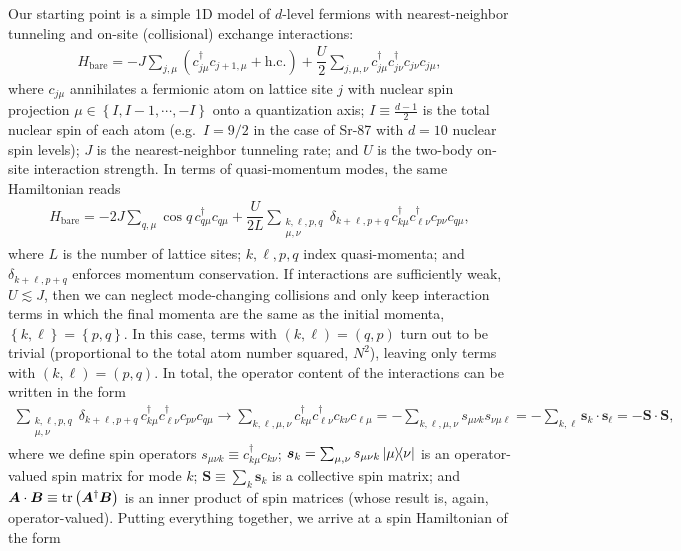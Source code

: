\documentclass[nofootinbib,notitlepage,11pt]{revtex4-2}
\renewcommand{\t}{\text} %
\newcommand{\f}[2]{\dfrac{#1}{#2}} %
\newcommand{\p}[1]{\left(#1\right)} %
\renewcommand{\set}[1]{\left\{#1\right\}} %
\renewcommand{\v}{\bm} %
\renewcommand{\c}{\cdot} %
\newcommand{\1}{\mathds{1}}
\begin{document}
Our starting point is a simple 1D model of $d$-level fermions with nearest-neighbor tunneling and on-site (collisional) exchange interactions:
\begin{align}
  H_{\t{bare}} = -J \sum_{j,\mu}
  \p{c_{j\mu}^\dag c_{j+1,\mu} + \t{h.c.}}
  + \f{U}{2} \sum_{j,\mu,\nu} c_{j\mu}^\dag c_{j\nu}^\dag c_{j\nu} c_{j\mu},
  \label{eq:bare_sites}
\end{align}
where $c_{j\mu}$ annihilates a fermionic atom on lattice site $j$ with nuclear spin projection $\mu\in\set{I,I-1,\cdots,-I}$ onto a quantization axis; $I\equiv\frac{d-1}{2}$ is the total nuclear spin of each atom (e.g.~$I=9/2$ in the case of Sr-87 with $d=10$ nuclear spin levels); $J$ is the nearest-neighbor tunneling rate; and $U$ is the two-body on-site interaction strength.
In terms of quasi-momentum modes, the same Hamiltonian reads
\begin{align}
  H_{\t{bare}} = -2J \sum_{q,\mu} \cos q\, c_{q\mu}^\dag c_{q\mu}
  + \f{U}{2L} \sum_{\substack{k,\ell,p,q\\\mu,\nu}}
  \delta_{k+\ell,p+q}\, c_{k\mu}^\dag c_{\ell\nu}^\dag c_{p\nu} c_{q\mu},
  \label{eq:bare_momenta}
\end{align}
where $L$ is the number of lattice sites; $k,\ell,p,q$ index quasi-momenta; and $\delta_{k+\ell,p+q}$ enforces momentum conservation.
If interactions are sufficiently weak, $U\lesssim J$, then we can neglect mode-changing collisions and only keep interaction terms in which the final momenta are the same as the initial momenta, $\set{k,\ell}=\set{p,q}$.
In this case, terms with $\p{k,\ell}=\p{q,p}$ turn out to be trivial (proportional to the total atom number squared, $N^2$), leaving only terms with $\p{k,\ell}=\p{p,q}$.
In total, the operator content of the interactions can be written in the form
\begin{align}
  \sum_{\substack{k,\ell,p,q\\\mu,\nu}}
  \delta_{k+\ell,p+q}\, c_{k\mu}^\dag c_{\ell\nu}^\dag c_{p\nu} c_{q\mu}
  \to \sum_{k,\ell,\mu,\nu} c_{k\mu}^\dag c_{\ell\nu}^\dag
  c_{k\nu} c_{\ell\mu}
  = -\sum_{k,\ell,\mu,\nu} s_{\mu\nu k} s_{\nu\mu\ell}
  = -\sum_{k,\ell} \v s_k \c\v s_\ell
  = -\v S \c\v S,
\end{align}
where we define spin operators $s_{\mu\nu k}\equiv c_{k\mu}^\dag c_{k\nu}$; $\v s_k=\sum_{\mu,\nu}s_{\mu\nu k}\op{\mu}{\nu}$ is an operator-valued spin matrix for mode $k$; $\v S\equiv\sum_k \v s_k$ is a collective spin matrix; and $\v A\c\v B\equiv\tr\p{\v A^\dag \v B}$ is an inner product of spin matrices (whose result is, again, operator-valued).  Putting everything together, we arrive at a spin Hamiltonian of the form
\end{document}
